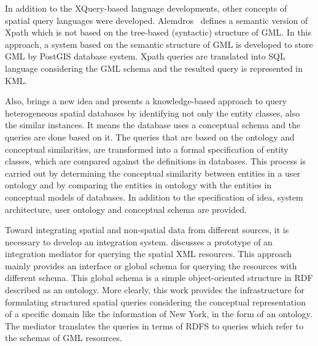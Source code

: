 \documentclass[a4paper,12pt]{article}
\begin{document}
In addition to the XQuery-based language developments, 
other concepts of spatial query languages were developed. 
Alemdros~\cite{Alemdros2011, Alemdros2013} defines a semantic version of Xpath 
which is not based on the tree-based (syntactic) structure of GML. 
In this approach, a system based on the semantic structure of GML is developed to store GML by PostGIS database system. 
Xpath queries are translated into SQL language considering the GML schema and the resulted query is represented in KML.

Also, \cite{Gutierrez2004} brings a new idea and presents a knowledge-based approach 
to query heterogeneous spatial databases by identifying not only the entity classes, also the similar instances. 
It means the database uses a conceptual schema and the queries are done based on it. 
The queries that are based on the ontology and conceptual similarities, 
are transformed into a formal specification of entity classes, which are compared against the definitions in databases. 
This process is carried out by determining the conceptual similarity between entities in a user ontology and 
by comparing the entities in ontology with the entities in conceptual models of databases. 
In addition to the specification of idea, system architecture, user ontology and conceptual schema are provided.

Toward integrating spatial and non-spatial data from different sources, 
it is necessary to develop an integration system. 
\cite{corcoles2004} discusses a prototype of an integration mediator for querying the spatial XML resources. 
This approach mainly provides an interface or global schema for querying the resources with different schema. 
This global schema is a simple object-oriented structure in RDF described as an ontology. 
More clearly, this work provides the infrastructure for formulating structured spatial queries 
considering the conceptual representation of a specific domain like the information of New York, 
in the form of an ontology. The mediator translates the queries in terms of RDFS to queries which refer to the schemas of GML resources.
\end{document}
